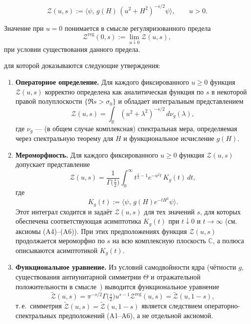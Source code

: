 \documentclass{article}
\numberwithin{equation}{section}
\theoremstyle{plain}
\theoremstyle{definition}
\theoremstyle{remark}
\def\infty{∞}\def\partial{∂}\def\sum{Σ}\def\int{∫}%
\begin{document}
\begin{equation}
\mathcal Z(u,s)
:=\big\langle \psi,\, g(H)\,(u^2+H^2)^{-s/2}\psi \big\rangle,
\qquad u>0.
\end{equation}

Значение при $u=0$ понимается в смысле регуляризованного предела
\begin{equation}
\mathcal Z^{\mathrm{reg}}(0,s)
:=\lim_{u\downarrow 0}\mathcal Z(u,s),
\end{equation}
при условии существования данного предела.


\noindent
для которой доказываются следующие утверждения:
\begin{enumerate}
  \item[(i)] \textbf{Операторное определение.} 
  Для каждого фиксированного $u \ge 0$ функция $\mathcal Z(u,s)$ корректно определена как аналитическая функция по $s$ в некоторой правой полуплоскости $\{\Re s > \sigma_0\}$ и обладает интегральным представлением
  \begin{equation}
  \mathcal Z(u,s)
  =\int_{\mathbb R} (u^2+\lambda^2)^{-s/2}\,d\nu_g(\lambda),
  \end{equation}
  где $\nu_g$ — (в общем случае комплексная) спектральная мера, определяемая через спектральную теорему для $H$ и функциональное исчисление $g(H)$.


  \item[(ii)] \textbf{Мероморфность.} 
  Для каждого фиксированного $u\ge 0$ функция $\mathcal Z(u,s)$ допускает представление
  \begin{equation}
  \mathcal Z(u,s)
  =\frac{1}{\Gamma\!\big(\tfrac{s}{2}\big)}
   \int_0^\infty t^{\frac{s}{2}-1} e^{-u^2 t}\,K_g(t)\,dt,
  \end{equation}
  где
  \begin{equation}
  K_g(t):=\langle\psi,\,g(H)e^{-tH^2}\psi\rangle.
  \end{equation}
  Этот интеграл сходится и задаёт $\mathcal Z(u,s)$ для тех значений $s$, для которых обеспечена соответствующая асимптотика $K_g(t)$ при $t\downarrow 0$ и $t\to\infty$ (см. аксиомы (A4)–(A6)). 
  При этих предположениях функция $\mathcal Z(u,s)$ продолжается мероморфно по $s$ на всю комплексную плоскость $\mathbb C$, а полюса описываются асимптотикой $K_g(t)$.

  \item[(iii)] \textbf{Функциональное уравнение.}
  Из условий самодвойности ядра (чётности $g$, существования антиунитарной симметрии $\Theta$ и отражательной положительности в смысле~\cite{OsterwalderSchrader1973}) выводится функциональное уравнение
  \begin{equation}
  \widetilde{\mathcal Z}(u,s)
  =\pi^{-s/2}\Gamma\!\big(\tfrac{s}{2}\big)u^{s-1}\mathcal Z^{\mathrm{reg}}(u,s)
  =\widetilde{\mathcal Z}(u,1-s),
  \end{equation}
  т.\,е.\ симметрия $\widetilde{\mathcal Z}(u,s)=\widetilde{\mathcal Z}(u,1-s)$ является следствием операторно-спектральных предположений (A1–A6), а не отдельной аксиомой.



\end{enumerate}
\end{document}
